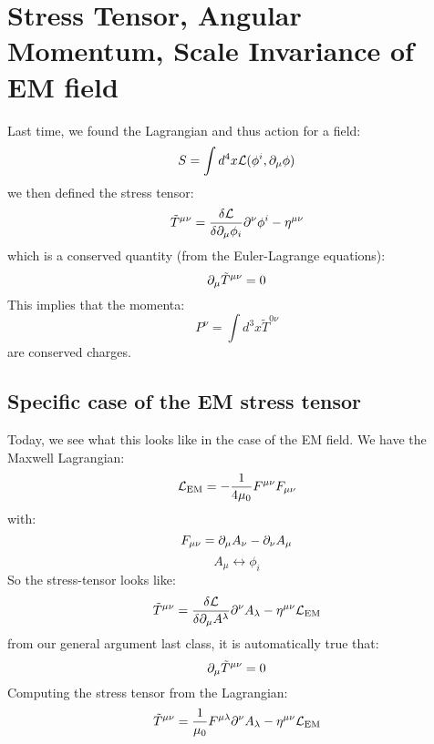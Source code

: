 \section{Stress Tensor, Angular Momentum, Scale Invariance of EM field}

Last time, we found the Lagrangian and thus action for a field:
\begin{equation}
    S = \int d^4x \mathcal{L}(\phi^i, \partial_\mu \phi)
\end{equation}
we then defined the stress tensor:
\begin{equation}
    \tilde{T}^{\mu\nu} = \frac{\delta \mathcal{L}}{\delta \partial_\mu \phi_i}\partial^\nu \phi^i - \eta^{\mu\nu}
\end{equation}
which is a conserved quantity (from the Euler-Lagrange equations):
\begin{equation}
    \partial_\mu \tilde{T}^{\mu\nu} = 0
\end{equation}
This implies that the momenta:
\begin{equation}
    P^\nu = \int d^3x \tilde{T}^{0\nu}
\end{equation}
are conserved charges.

\subsection{Specific case of the EM stress tensor}

Today, we see what this looks like in the case of the EM field. We have the Maxwell Lagrangian:
\begin{equation}
    \mathcal{L}_{\text{EM}} = -\frac{1}{4\mu_0}F^{\mu\nu}F_{\mu\nu}
\end{equation} 
with:
\begin{equation}
    F_{\mu\nu} = \partial_\mu A_\nu - \partial_\nu A_\mu
\end{equation}
\begin{equation}
    A_\mu \leftrightarrow \phi_i
\end{equation}
So the stress-tensor looks like:
\begin{equation}
    \tilde{T}^{\mu\nu} = \frac{\delta \mathcal{L}}{\delta \partial_\mu A^\lambda}\partial^\nu A_\lambda - \eta^{\mu\nu}\mathcal{L}_{\text{EM}}
\end{equation}
from our general argument last class, it is automatically true that:
\begin{equation}
    \partial_\mu \tilde{T}^{\mu\nu} = 0
\end{equation}
Computing the stress tensor from the Lagrangian:
\begin{equation}
    \tilde{T}^{\mu\nu} = \frac{1}{\mu_0}F^{\mu\lambda}\partial^\nu A_\lambda - \eta^{\mu\nu}\mathcal{L}_{\text{EM}}
\end{equation}

